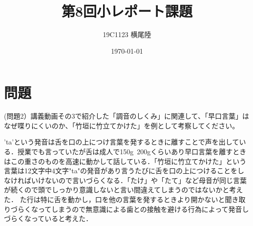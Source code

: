 \documentclass[dvipdfmx]{jsarticle}
\begin{document}
\title{第8回小レポート課題}
\author{19C1123 横尾陸}
\date{\today}
\maketitle
\section*{問題}
(問題2）講義動画その3で紹介した「調音のしくみ」に関連して、「早口言葉」はなぜ喋りにくいのか、「竹垣に竹立てかけた」を例として考察してください。

'ta'という発音は舌を口の上につけ言葉を発するときに離すことで声を出している．授業でも言っていたが舌は成人で150g~200gくらいあり早口言葉を離すときはこの重さのものを高速に動かして話している．「竹垣に竹立てかけた」という言葉は12文字中4文字"ta"の発音があり言うたびに舌を口の上につけることをしなければいけないので言いづらくなる．「たけ」や「たて」など母音が同じ言葉が続くので頭でしっかり意識しないと言い間違えてしまうのではないかと考えた．
た行は特に舌を動かし，口を他の言葉を発するときより開かないと聞き取りづらくなってしまうので無意識による歯との接触を避ける行為によって発音しづらくなっていると考えた．
\end{document}
